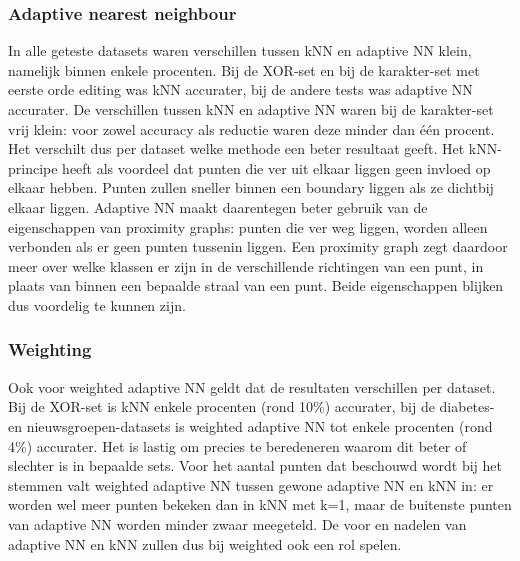 \documentclass{article}
\begin{document}
\subsubsection{Adaptive nearest neighbour}
In alle geteste datasets waren verschillen tussen kNN en adaptive NN klein, namelijk binnen enkele procenten. Bij de XOR-set en bij de karakter-set met eerste orde editing was kNN accurater, bij de andere tests was adaptive NN accurater. De verschillen tussen kNN en adaptive NN waren bij de karakter-set vrij klein: voor zowel accuracy als reductie waren deze minder dan \'{e}\'{e}n procent. Het verschilt dus per dataset welke methode een beter resultaat geeft. Het kNN-principe heeft als voordeel dat punten die ver uit elkaar liggen geen invloed op elkaar hebben. Punten zullen sneller binnen een boundary liggen als ze dichtbij elkaar liggen. Adaptive NN maakt daarentegen beter gebruik van de eigenschappen van proximity graphs: punten die ver weg liggen, worden alleen verbonden als er geen punten  tussenin liggen. Een proximity graph zegt daardoor meer over welke klassen er zijn in de verschillende richtingen van een punt, in plaats van binnen een bepaalde straal van een punt. Beide eigenschappen blijken dus voordelig te kunnen zijn.

\subsubsection{Weighting}
Ook voor weighted adaptive NN geldt dat de resultaten verschillen per dataset. Bij de XOR-set is kNN enkele procenten (rond 10\%) accurater, bij de diabetes- en nieuwsgroepen-datasets is weighted adaptive NN tot enkele procenten (rond 4\%) accurater. Het is lastig om precies te beredeneren waarom dit beter of slechter is in bepaalde sets. Voor het aantal punten dat beschouwd wordt bij het stemmen valt weighted adaptive NN tussen gewone adaptive NN en kNN in: er worden wel meer punten bekeken dan in kNN met k=1, maar de buitenste punten van adaptive NN worden minder zwaar meegeteld. De voor en nadelen van adaptive NN en kNN zullen dus bij weighted ook een rol spelen.
\end{document}
